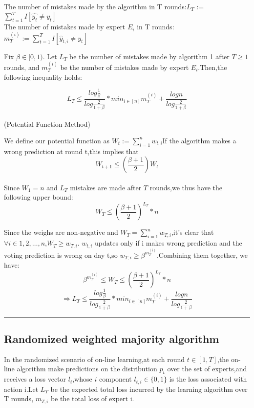 \documentclass[twoside]{article}
\newenvironment{proof}{{\bf Proof:}}{\hfill\rule{2mm}{2mm}}
\begin{document}
The number of mistakes made by the algorithm in T rounds:$L_T$ := $\sum^{T}_{t = 1} I[\hat{y_t} \neq y_t]$\\
The number of mistakes made by expert  $E_i$ in T rounds:$m_T^{(i)} := \sum^T_{t = 1}I[\hat{y}_{t,i} \neq y_t]$\\
	
	

Fix $\beta \in [0,1)$. Let $L_T$ be the number of mistakes made by algorithm 1 after $T\ge 1$ rounds, and $m_T^{(i)}$ be the number of mistakes made by expert $E_i$.Then,the following inequality holds:

$$L_T \leqslant \frac{log \frac{1}{\beta}}{log \frac{2}{1 + \beta}} * min_{i \in [n]} m_T^{(i)} + \frac{logn}{log \frac{2}{1 + \beta}}$$\\

\begin{proof}
(Potential Function Method)


	We define our potential function as $W_t := \sum^n_{i=1}w_{t,i}$If the algorithm makes a wrong prediction at round t,this implies that\\
	$$W_{t+1} \leqslant (\frac{\beta +1}{2})W_t$$\\
	Since $W_1=n$ and $L_T$ mistakes are made after $T$ rounds,we thus have the following upper bound:
	$$W_T \leqslant  (\frac{\beta + 1}{2}) ^{L_T}*n  $$
	
	Since the weighs are non-negative and $W_T = \sum ^{n}_{i=1} w_{T,i}$,it's clear that $\forall i \in 1,2,\dots,n$,$W_T \ge w_{T,i}$.
$w_{t,i}$ updates only if i makes wrong prediction and the voting prediction is wrong on day t,so $w_{T,i} \geqslant \beta^{m_T^{(i)}}$.Combining them together, we have:
	$$\beta^{m_T^{(i)}} \le W_T \leqslant  (\frac{\beta + 1}{2}) ^{L_T}*n  $$
	$$\Rightarrow L_T \leqslant \frac{log \frac{1}{\beta}}{log \frac{2}{1 + \beta}} * min_{i \in [n]} m_T^{(i)} + \frac{logn}{log \frac{2}{1 + \beta}}$$
	

\end{proof}

\subsection{Randomized weighted majority algorithm}

In the randomized scenario of on-line learning,at each round $t \in [1,T]$,the on-line algorithm make predictions on the distribution $p_t$ over the set of experts,and receives a loss vector $l_t$,whose $i$ component $l_{t,i} \in \{0,1\}$ is the loss associated with action i.Let $L_T$ be the expected total loss incurred by the learning algorithm over T rounds, $m_{T,i}$ be the total loss of expert i.
\end{document}

